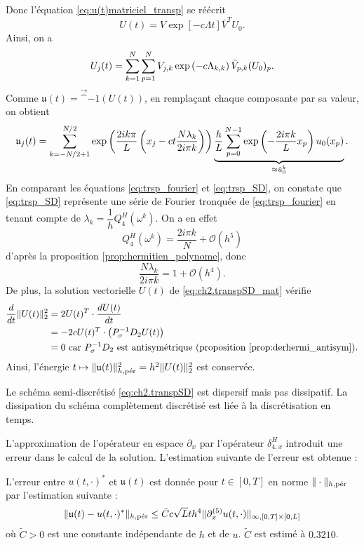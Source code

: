 Donc l'équation \eqref{eq:u(t)matriciel_transp} se réécrit
\begin{equation}
U(t) = V \exp \left[-c \Lambda t \right] \bar{V}^T U_0.
\end{equation}
Ainsi, on a
\begin{equation}
U_j(t) = \gsum_{k=1}^{N} \gsum_{p=1}^N V_{j,k} \exp \left( - c \Lambda_{k,k}  \right)  \bar{V}_{p,k}(U_0)_p.
\end{equation}
Comme $\mathfrak{u}(t) = \vec^{-1}(U(t))$, en remplaçant chaque composante par sa valeur, on obtient
\begin{equation}
\mathfrak{u}_j(t) = \gsum_{k=-N/2+1}^{N/2} \exp \left( \dfrac{2 i k \pi}{L} \left( x_j - ct \dfrac{N \lambda_k}{2 i \pi k} \right) \right) \underbrace{\dfrac{h}{L} \gsum_{p=0}^{N-1} \exp \left( - \dfrac{2 i \pi k}{L} x_p \right) u_0(x_p)}_{ \approx \hat{u}^k_0}.
\label{eq:trsp_SD}
\end{equation}
En comparant les équations \eqref{eq:trsp_fourier} et \eqref{eq:trsp_SD}, on constate que \eqref{eq:trsp_SD} représente une série de Fourier tronquée de \eqref{eq:trsp_fourier} en tenant compte de $\lambda_k = \dfrac{1}{h}Q_4^H(\omega^k)$. On a en effet
\begin{equation}
Q_4^H(\omega^k) = \dfrac{2 i \pi k}{N} + \mathcal{O} \left( h^5 \right)
\end{equation}
d'après la proposition \ref{prop:hermitien_polynome}, donc
\begin{equation}
\dfrac{N \lambda_k}{2 i \pi k} = 1 + \mathcal{O}(h^4).
\end{equation}
De plus, la solution vectorielle $U(t)$ de \eqref{eq:ch2.transpSD_mat} vérifie
\begin{align*}
\dfrac{d}{dt} \| U(t) \|_2^2 & = 2 U(t)^T \cdot \dfrac{d U(t)}{dt} \\
	& = - 2 c U(t)^T \cdot \left( P_{\sigma}^{-1}D_2 U(t) \right) \\
	& = 0 \text{ car } P_{\sigma}^{-1}D_2 \text{ est antisymétrique (proposition \ref{prop:derhermi_antisym})}.
\end{align*}
Ainsi, l'énergie $t \mapsto \| \mathfrak{u}(t) \|_{h,\per}^2 = h^2 \| U(t) \|_2^2$ est conservée.

Le schéma semi-discrétisé \eqref{eq:ch2.transpSD} est dispersif mais pas dissipatif. La dissipation du schéma complètement discrétisé est liée à la discrétisation en temps.

L'approximation de l'opérateur en espace $\partial_x$ par l'opérateur $\delta_{4,x}^H$ introduit une erreur dans le calcul de la solution. L'estimation suivante de l'erreur est obtenue :
\begin{proposition}
L'erreur entre $u(t,\cdot)^*$ et $\mathfrak{u}(t)$ est donnée pour $t \in [0,T]$ en norme $\| \cdot \|_{h,\per}$ par l'estimation suivante :
\begin{equation}
\| \mathfrak{u}(t) - u(t,\cdot)^* \|_{h,\per} \leq \tilde{C} c \sqrt{L} t h^4 \| \partial_x^{(5)} u(t,\cdot) \|_{\infty,[0,T] \times [0,L]}
\end{equation}
où $\tilde{C}>0$ est une constante indépendante de $h$ et de $u$. $\tilde{C}$ est estimé à $0.3210$.
\label{prop:consistance_h_trsp}
\end{proposition}

